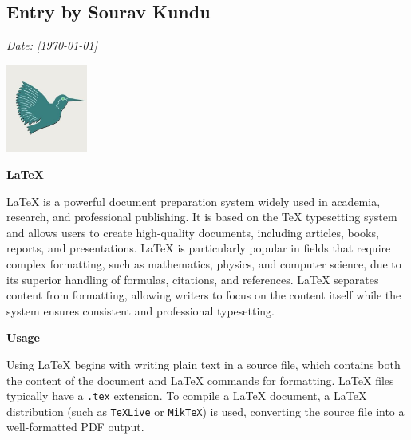 \documentclass[12pt, a4paper]{article}
\begin{document}
\subsection*{Entry by Sourav Kundu}
\textit{Date: [\today]}\\
\begin{center}
    \includegraphics[width=0.2\textwidth]{latex.jpg} %
    \vspace{0.8cm} %
\end{center}

\begin{center}
    {\LARGE \textbf{LaTeX}}
\end{center}

\vspace{0.3cm} %

\noindent
LaTeX is a powerful document preparation system widely used in academia, research, and professional publishing. It is based on the TeX typesetting system and allows users to create high-quality documents, including articles, books, reports, and presentations. LaTeX is particularly popular in fields that require complex formatting, such as mathematics, physics, and computer science, due to its superior handling of formulas, citations, and references. LaTeX separates content from formatting, allowing writers to focus on the content itself while the system ensures consistent and professional typesetting.

\vspace{0.5cm} %

\noindent
\textbf{\Large Usage}

\vspace{0.3cm} %

\noindent
Using LaTeX begins with writing plain text in a source file, which contains both the content of the document and LaTeX commands for formatting. LaTeX files typically have a \texttt{.tex} extension. To compile a LaTeX document, a LaTeX distribution (such as \texttt{TeXLive} or \texttt{MikTeX}) is used, converting the source file into a well-formatted PDF output.

\vspace{0.2cm}
\end{document}
